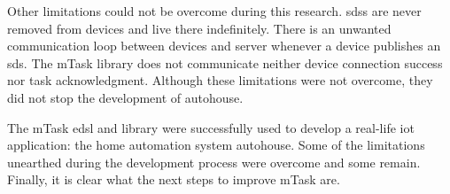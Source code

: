 Other limitations could not be overcome during this research. \acsp{sds} are never removed from devices and live there indefinitely. There is an unwanted communication loop between devices and server whenever a device publishes an \acs{sds}. The \gls{mTask} library does not communicate neither device connection success nor task acknowledgment. Although these limitations were not overcome, they did not stop the development of \gls{autohouse}. 

The \gls{mTask} \acs{edsl} and library were successfully used to develop a real-life \acs{iot} application: the home automation system \gls{autohouse}. Some of the limitations unearthed during the development process were overcome and some remain. Finally, it is clear what the next steps to improve \gls{mTask} are.